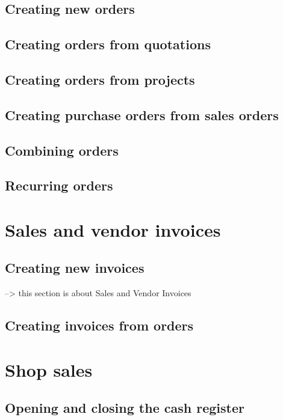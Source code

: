 \section{Creating new orders}

\section{Creating orders from quotations}

\section{Creating orders from projects}

\section{Creating purchase orders from sales orders}

\section{Combining orders}

\section{Recurring orders}


\chapter{Sales and vendor invoices}

\section{Creating new invoices}

--> this section is about Sales and Vendor Invoices

\section{Creating invoices from orders}

\chapter{Shop sales}

\section{Opening and closing the cash register}

